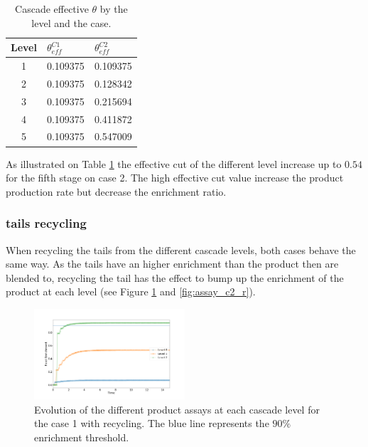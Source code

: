 \documentclass{anstrans}
\begin{document}
\begin{table}[htb]
\centering
\begin{tabular}{cll}
\toprule

Level   &  $\theta_{eff}^{C1}$   & $\theta_{eff}^{C2}$ \\ 
\midrule
1       & 0.109375               & 0.109375     \\
2       & 0.109375               & 0.128342     \\
3       & 0.109375               & 0.215694     \\
4       & 0.109375               & 0.411872     \\
5       & 0.109375               & 0.547009     \\

\bottomrule
\end{tabular}
  \caption{Cascade effective $\theta$ by the level and the case.}
  \label{tab:cascade_theta}
\end{table}
As illustrated on Table \ref{tab:cascade_theta} the effective cut of the
different level increase up to $0.54$ for the fifth stage on case 2. The high
effective cut value increase the product production rate but decrease the
enrichment ratio.

\subsubsection{tails recycling}
When recycling the tails from the different cascade levels, both cases behave
the same way. As the tails have an higher enrichment than the product then are
blended to, recycling the tail has the effect to bump up the enrichment of the
product at each level (see Figure \ref{fig:assay_c1_r} and \ref{fig:assay_c2_r}).

\begin{figure}[ht] %
  \centering
  \includegraphics[width=0.5\textwidth]{assay_case_1_rec.png}
  \caption{Evolution of the different product assays at each cascade level for
  the case 1 with recycling. The blue line represents the $90\%$ enrichment
  threshold.}\label{fig:assay_c1_r}
\end{figure}
\end{document}
